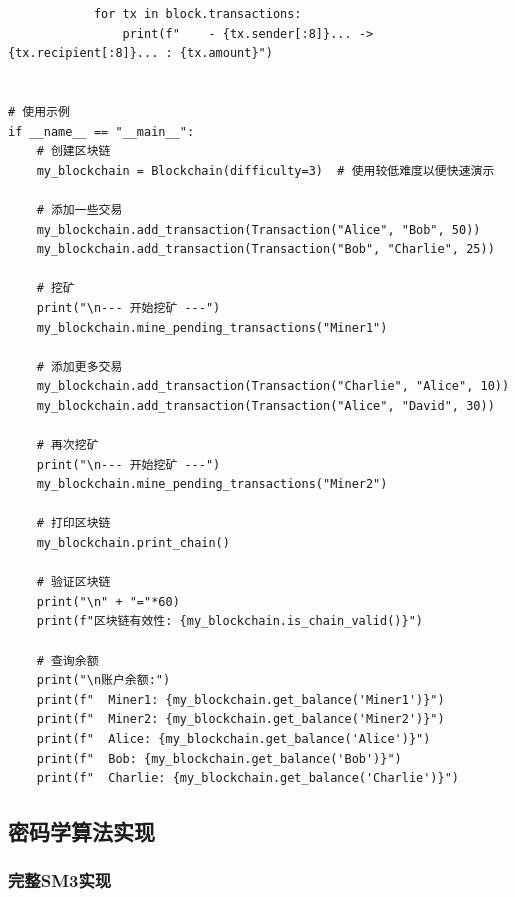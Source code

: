 ﻿\documentclass[12pt,a4paper]{article}
\begin{document}
\begin{lstlisting}
            for tx in block.transactions:
                print(f"    - {tx.sender[:8]}... -> {tx.recipient[:8]}... : {tx.amount}")


# 使用示例
if __name__ == "__main__":
    # 创建区块链
    my_blockchain = Blockchain(difficulty=3)  # 使用较低难度以便快速演示
    
    # 添加一些交易
    my_blockchain.add_transaction(Transaction("Alice", "Bob", 50))
    my_blockchain.add_transaction(Transaction("Bob", "Charlie", 25))
    
    # 挖矿
    print("\n--- 开始挖矿 ---")
    my_blockchain.mine_pending_transactions("Miner1")
    
    # 添加更多交易
    my_blockchain.add_transaction(Transaction("Charlie", "Alice", 10))
    my_blockchain.add_transaction(Transaction("Alice", "David", 30))
    
    # 再次挖矿
    print("\n--- 开始挖矿 ---")
    my_blockchain.mine_pending_transactions("Miner2")
    
    # 打印区块链
    my_blockchain.print_chain()
    
    # 验证区块链
    print("\n" + "="*60)
    print(f"区块链有效性: {my_blockchain.is_chain_valid()}")
    
    # 查询余额
    print("\n账户余额:")
    print(f"  Miner1: {my_blockchain.get_balance('Miner1')}")
    print(f"  Miner2: {my_blockchain.get_balance('Miner2')}")
    print(f"  Alice: {my_blockchain.get_balance('Alice')}")
    print(f"  Bob: {my_blockchain.get_balance('Bob')}")
    print(f"  Charlie: {my_blockchain.get_balance('Charlie')}")
\end{lstlisting}

\subsection{密码学算法实现}

\subsubsection{完整SM3实现}
\end{document}
